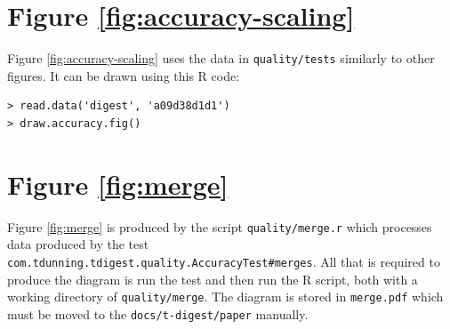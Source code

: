 \documentclass[]{statsoc}
\begin{document}
\section{Figure \ref{fig:accuracy-scaling}}
Figure \ref{fig:accuracy-scaling} uses the data in {\tt quality/tests} similarly to other figures. It can be drawn using this R code:
\begin{verbatim}
> read.data('digest', 'a09d38d1d1')
> draw.accuracy.fig()
\end{verbatim}
\section{Figure \ref{fig:merge}}
Figure \ref{fig:merge} is produced by the script {\tt quality/merge.r} which processes data produced by the test {\tt com.tdunning.tdigest.quality.AccuracyTest\#merges}. All that is required to produce the diagram is run the test and then run the R script, both with a working directory of {\tt quality/merge}. The diagram is stored in {\tt merge.pdf} which must be moved to the {\tt docs/t-digest/paper} manually.
\end{document}
